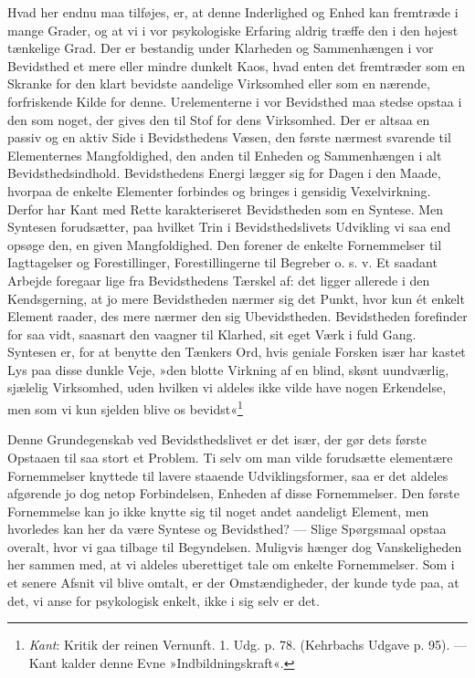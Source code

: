 \documentclass[12pt,a4paper,openany]{book}
\newcommand{\opage}[1]{\marginnote{\footnotesize\textit{[#1]}}}
\begin{document}
Hvad her endnu maa tilføjes, er, at denne Inderlighed og Enhed kan
fremtræde i mange Grader, og at vi i vor psykologiske Erfaring aldrig
træffe den i den højest tænkelige Grad. Der er bestandig under Klarheden
og Sammenhængen i vor Bevidsthed et mere eller mindre dunkelt Kaos, hvad
enten det fremtræder som en Skranke for den klart bevidste aandelige
Virksomhed eller som en nærende, forfriskende Kilde for denne.
Urelementerne i vor Bevidsthed maa stedse opstaa i den som noget, der
gives den til Stof for dens Virksomhed. Der er altsaa en passiv og en
aktiv Side i Bevidsthedens Væsen, den første nærmest svarende til
Elementernes Mangfoldighed, den anden til Enheden og Sammenhængen i alt
Bevidsthedsindhold. Bevidsthedens Energi lægger sig for Dagen i den
Maade, hvorpaa de enkelte Elementer forbindes og bringes i gensidig
Vexelvirkning. Derfor har Kant med Rette karakteriseret Bevidstheden som
en Syntese. Men Syntesen forudsætter, paa hvilket Trin i
Bevidsthedslivets Udvikling vi saa end opsøge den, en given
Mangfoldighed. Den forener de enkelte Fornemmelser til Iagttagelser og
Forestillinger, Forestillingerne til Begreber o. s. v. Et saadant
Arbejde foregaar lige fra Bevidsthedens Tærskel af: det ligger allerede
i den Kendsgerning, at jo mere
\opage{59}Bevidstheden nærmer sig det Punkt, hvor kun ét enkelt Element
raader, des mere nærmer den sig Ubevidstheden. Bevidstheden forefinder
for saa vidt, saasnart den vaagner til Klarhed, sit eget Værk i fuld
Gang. Syntesen er, for at benytte den Tænkers Ord, hvis geniale Forsken
især har kastet Lys paa disse dunkle Veje, »den blotte Virkning af en
blind, skønt uundværlig, sjælelig Virksomhed, uden hvilken vi aldeles
ikke vilde have nogen Erkendelse, men som vi kun sjelden blive os
bevidst«\footnote[1]{\emph{Kant}: Kritik der reinen Vernunft. 1. Udg. p.
78. (Kehrbachs Udgave p. 95). --- Kant kalder denne Evne
»Indbildningskraft«.}

Denne Grundegenskab ved Bevidsthedslivet er det især, der gør dets
første Opstaaen til saa stort et Problem. Ti selv om man vilde
forudsætte elementære Fornemmelser knyttede til lavere staaende
Udviklingsformer, saa er det aldeles afgørende jo dog netop
Forbindelsen, Enheden af disse Fornemmelser. Den første Fornemmelse kan
jo ikke knytte sig til noget andet aandeligt Element, men hvorledes kan
her da være Syntese og Bevidsthed? --- Slige Spørgsmaal opstaa overalt,
hvor vi gaa tilbage til Begyndelsen. Muligvis hænger dog Vanskeligheden
her sammen med, at vi aldeles uberettiget tale om enkelte Fornemmelser.
Som i et senere Afsnit vil blive omtalt, er der Omstændigheder, der
kunde tyde paa, at det, vi anse for psykologisk enkelt, ikke i sig selv
er det.
\end{document}
